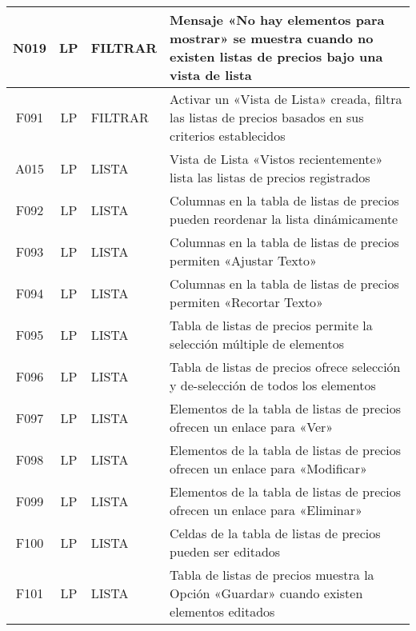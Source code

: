 \begin{landscape}
{\begin{longtable}[htb]{|c|c|p{3.8cm}|p{15.2cm}|}
\scriptsize{N019} & \scriptsize{LP} & \scriptsize{FILTRAR} & \scriptsize{Mensaje «No hay elementos para mostrar» se muestra cuando no existen listas de precios bajo una vista de lista} \\ \hline
\scriptsize{F091} & \scriptsize{LP} & \scriptsize{FILTRAR} & \scriptsize{Activar un «Vista de Lista» creada, filtra las listas de precios basados en sus criterios establecidos} \\ \hline
\scriptsize{A015} & \scriptsize{LP} & \scriptsize{LISTA} & \scriptsize{Vista de Lista «Vistos recientemente» lista las listas de precios registrados} \\ \hline
\scriptsize{F092} & \scriptsize{LP} & \scriptsize{LISTA} & \scriptsize{Columnas en la tabla de listas de precios pueden reordenar la lista dinámicamente} \\ \hline
\scriptsize{F093} & \scriptsize{LP} & \scriptsize{LISTA} & \scriptsize{Columnas en la tabla de listas de precios permiten «Ajustar Texto»} \\ \hline
\scriptsize{F094} & \scriptsize{LP} & \scriptsize{LISTA} & \scriptsize{Columnas en la tabla de listas de precios permiten «Recortar Texto»} \\ \hline
\scriptsize{F095} & \scriptsize{LP} & \scriptsize{LISTA} & \scriptsize{Tabla de listas de precios permite la selección múltiple de elementos} \\ \hline
\scriptsize{F096} & \scriptsize{LP} & \scriptsize{LISTA} & \scriptsize{Tabla de listas de precios ofrece selección y de-selección de todos los elementos} \\ \hline
\scriptsize{F097} & \scriptsize{LP} & \scriptsize{LISTA} & \scriptsize{Elementos de la tabla de listas de precios ofrecen un enlace para «Ver»} \\ \hline
\scriptsize{F098} & \scriptsize{LP} & \scriptsize{LISTA} & \scriptsize{Elementos de la tabla de listas de precios ofrecen un enlace para «Modificar»} \\ \hline
\scriptsize{F099} & \scriptsize{LP} & \scriptsize{LISTA} & \scriptsize{Elementos de la tabla de listas de precios ofrecen un enlace para «Eliminar»} \\ \hline
\scriptsize{F100} & \scriptsize{LP} & \scriptsize{LISTA} & \scriptsize{Celdas de la tabla de listas de precios pueden ser editados} \\ \hline
\scriptsize{F101} & \scriptsize{LP} & \scriptsize{LISTA} & \scriptsize{Tabla de listas de precios muestra la Opción «Guardar» cuando existen elementos editados} \\ \hline

\end{longtable}}
\end{landscape}
